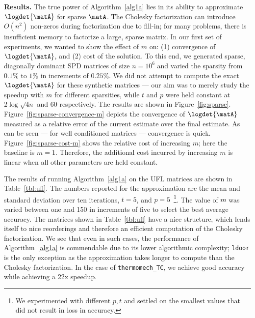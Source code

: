\vspace{0.02in}\noindent \textbf{Results.}
The true power of Algorithm~\ref{alg1a} lies in its ability to approximate
$\logdet{\matA}$ for sparse $\matA$.
The Cholesky factorization can introduce $O(n^2)$ non-zeros during
factorization due to fill-in; for many problems, there is insufficient
memory to factorize a large, sparse matrix.
In our first set of experiments, we wanted to show the effect of $m$ on: (1)
convergence of $\logdet{\matA}$, and (2) cost of the solution.
To this end, we generated sparse, diagonally dominant SPD matrices of size
$n=10^6$ and varied the sparsity from $0.1\%$ to $1\%$ in increments of
$0.25\%$.
We did not attempt to compute the exact $\logdet{\matA}$ for these synthetic
matrices --- our aim was to merely study the speedup with $m$ for different
sparsities, while $t$ and $p$ were held constant at $2\log\sqrt{4n}$ and $60$
respectively.
The results are shown in Figure~\ref{fig:sparse}.
Figure~\ref{fig:sparse-convergence-m} depicts the convergence of
$\logdet{\matA}$ measured as a relative error of the current estimate over the
final estimate.
As can be seen --- for well conditioned matrices --- convergence is quick.
Figure~\ref{fig:sparse-cost-m} shows the relative cost of increasing $m$; here
the baseline is $m=1$.
Therefore, the additional cost incurred by increasing $m$ is linear when
all other parameters are held constant.

The results of running Algorithm~\ref{alg1a} on the UFL matrices are shown in
Table~\ref{tbl:ufl}.
The numbers reported for the approximation are the mean and standard deviation
over ten iterations, $t=5$, and $p=5$~\footnote{We experimented with different
$p,t$ and settled on the smallest values that did not result in loss in
accuracy.}.
The value of $m$ was varied between one and 150 in increments of five to select the best
average accuracy.
The matrices shown in Table~\ref{tbl:ufl} have a nice structure, which lends
itself to nice reorderings and therefore an efficient computation of the Cholesky factorization.
We see that even in such cases, the performance of Algorithm~\ref{alg1a} is
commendable due to its lower
algorithmic complexity; \texttt{ldoor} is the only exception as the
approximation takes longer to compute than the Cholesky factorization.
In the case of \texttt{thermomech\_TC}, we achieve good accuracy while achieving
a 22x speedup.
%
